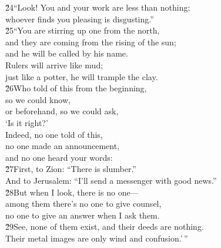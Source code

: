 \begin{poetry}
\poeml \v{24}``Look! You and your work are less than nothing; \\
\poemll    whoever finds you pleasing is disgusting.'' \\
\poeml \v{25}``You are stirring up one from the north, \\
\poemll    and they are coming from the rising of the sun; \\
\poemlll       and he will be called by his name. \\
\poeml Rulers will arrive like mud; \\
\poemll    just like a potter, he will trample the clay. \\
\poeml \v{26}Who told of this from the beginning, \\
\poemll    so we could know, \\
\poeml or beforehand, so we could ask, \\
\poemll    `Is it right?' \\
\poeml Indeed, no one told of this, \\
\poemll    no one made an announcement, \\
\poemlll       and no one heard your words: \\
\poeml \v{27}First, to Zion: ``There is slumber.'' \\
\poemll    And to Jerusalem: ``I'll send a messenger with good news.'' \\
\poeml \v{28}But when I look, there is no one--- \\
\poemll    among them there's no one to give counsel, \\
\poemlll       no one to give an answer when I ask them. \\
\poeml \v{29}See, none of them exist, and their deeds are nothing. \\
\poemll    Their metal images are only wind and confusion.'\,''
\end{poetry}

